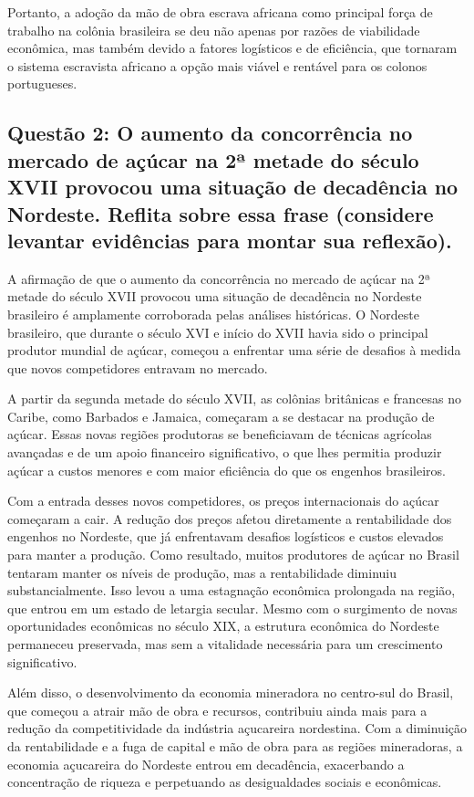 \documentclass[a4paper,12pt]{article}[abntex2]
\begin{document}
Portanto, a adoção da mão de obra escrava africana como principal força de trabalho na colônia brasileira se deu não apenas por razões de viabilidade econômica, mas também devido a fatores logísticos e de eficiência, que tornaram o sistema escravista africano a opção mais viável e rentável para os colonos portugueses.

\subsection{\textbf{Questão 2: O aumento da concorrência no mercado de açúcar na 2ª metade do século XVII provocou uma situação de decadência no Nordeste. Reflita sobre essa frase (considere levantar evidências para montar sua reflexão).}}

A afirmação de que o aumento da concorrência no mercado de açúcar na 2ª metade do século XVII provocou uma situação de decadência no Nordeste brasileiro é amplamente corroborada pelas análises históricas. O Nordeste brasileiro, que durante o século XVI e início do XVII havia sido o principal produtor mundial de açúcar, começou a enfrentar uma série de desafios à medida que novos competidores entravam no mercado.

A partir da segunda metade do século XVII, as colônias britânicas e francesas no Caribe, como Barbados e Jamaica, começaram a se destacar na produção de açúcar. Essas novas regiões produtoras se beneficiavam de técnicas agrícolas avançadas e de um apoio financeiro significativo, o que lhes permitia produzir açúcar a custos menores e com maior eficiência do que os engenhos brasileiros.

Com a entrada desses novos competidores, os preços internacionais do açúcar começaram a cair. A redução dos preços afetou diretamente a rentabilidade dos engenhos no Nordeste, que já enfrentavam desafios logísticos e custos elevados para manter a produção. Como resultado, muitos produtores de açúcar no Brasil tentaram manter os níveis de produção, mas a rentabilidade diminuiu substancialmente. Isso levou a uma estagnação econômica prolongada na região, que entrou em um estado de letargia secular. Mesmo com o surgimento de novas oportunidades econômicas no século XIX, a estrutura econômica do Nordeste permaneceu preservada, mas sem a vitalidade necessária para um crescimento significativo.

Além disso, o desenvolvimento da economia mineradora no centro-sul do Brasil, que começou a atrair mão de obra e recursos, contribuiu ainda mais para a redução da competitividade da indústria açucareira nordestina. Com a diminuição da rentabilidade e a fuga de capital e mão de obra para as regiões mineradoras, a economia açucareira do Nordeste entrou em decadência, exacerbando a concentração de riqueza e perpetuando as desigualdades sociais e econômicas.
\end{document}
